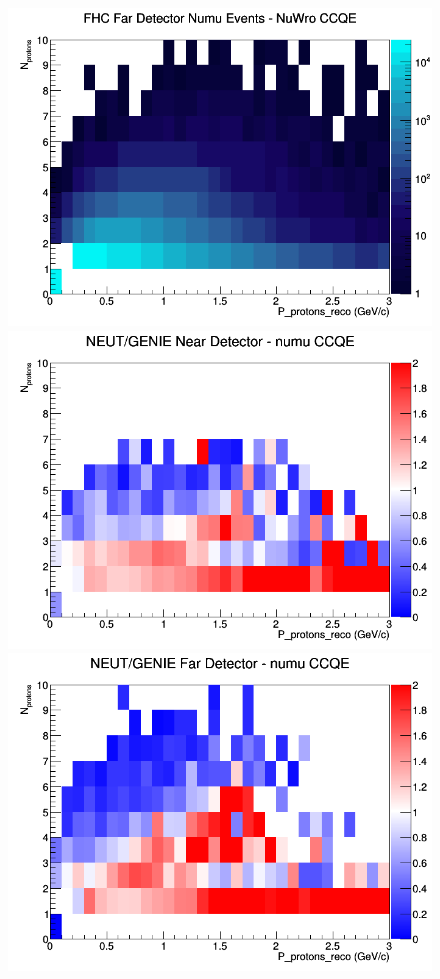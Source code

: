 \documentclass[12pt]{article}
\begin{document}
\begin{figure}[h]
\endminipage
{}
\includegraphics[width=\linewidth]{eff_N_P/FGT/protons/CCQE_FHC_FD_numu_N_P_NuWro.png}
\endminipage
\newline
{}
\includegraphics[width=\linewidth]{eff_N_P/FGT/protons/ratios/CCQE_NEUT_GENIE_numu_near_N_P.png}
\endminipage
{}
\includegraphics[width=\linewidth]{eff_N_P/FGT/protons/ratios/CCQE_NEUT_GENIE_numu_far_N_P.png}

\end{figure}
\end{document}
